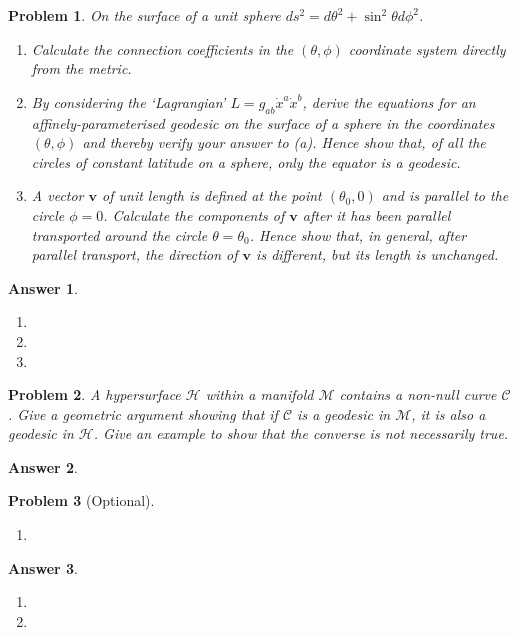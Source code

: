 \documentclass[a4paper]{article}
\newtheorem{ans}{Answer}[subsection]
\theoremstyle{new}
\newtheorem{qns}{Problem}[section]
\begin{document}
\newpage
\begin{qns}
On the surface of a unit sphere $ds^2 = d\theta^2 + \sin^2\theta d\phi^2$.
\begin{enumerate}[label=(\alph*)]
\item  Calculate the connection coefficients in the $(\theta,\phi)$ coordinate system directly from the metric.
\item By considering the ‘Lagrangian’ $L=g_{ab}\dot{x}^a\dot{x}^b$, derive the equations for an affinely-parameterised geodesic on the surface of a sphere in the coordinates $(\theta, \phi)$ and thereby verify your answer to (a). Hence show that, of all the circles of constant latitude on a sphere, only the equator is a geodesic.
\item A vector $\mathbf{v}$ of unit length is defined at the point $(\theta_0,0)$ and is parallel to the circle $\phi = 0$. Calculate the components of $\mathbf{v}$ after it has been parallel transported around the circle $\theta=\theta_0$. Hence show that, in general, after parallel transport, the direction of $\mathbf{v}$ is different, but its length is unchanged.
\end{enumerate}
\end{qns}
\begin{ans}\leavevmode
\begin{enumerate}[label=(\alph*)]
\item

\item 

\item 
\end{enumerate}
\end{ans}
\begin{qns}
A hypersurface $\mathcal{H}$ within a manifold $\mathcal{M}$ contains a non-null curve $\mathcal{C}$. Give a geometric argument showing that if $\mathcal{C}$ is a geodesic in $\mathcal{M}$, it is also a geodesic in $\mathcal{H}$. Give an example to show that the converse is not necessarily true.
\end{qns}
\begin{ans}

\end{ans}
\begin{qns}[Optional]\leavevmode
\begin{enumerate}[label=(\alph*)]
\item 

\end{enumerate}
\end{qns}
\begin{ans}\leavevmode
\begin{enumerate}[label=(\alph*)]
\item

\item 
\end{enumerate}
\end{ans}
\end{document}
